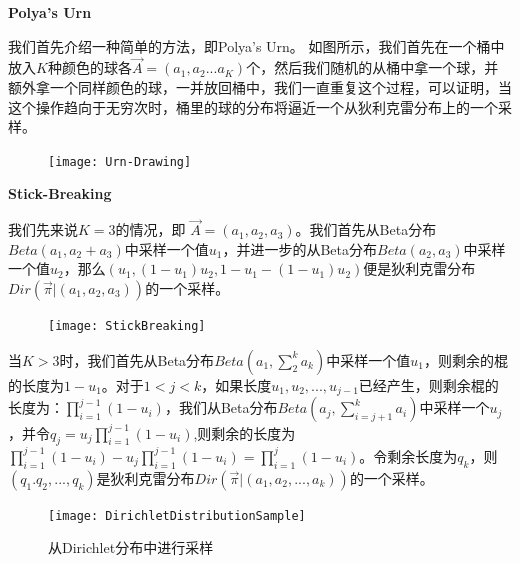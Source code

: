 \textbf{Polya's Urn}
 
我们首先介绍一种简单的方法，即Polya's Urn。
如图所示，我们首先在一个桶中放入$K$种颜色的球各$\vec{A} = (a_1,a_2...a_K)$个，然后我们随机的从桶中拿一个球，并额外拿一个同样颜色的球，一并放回桶中，我们一直重复这个过程，可以证明，当这个操作趋向于无穷次时，桶里的球的分布将逼近一个从狄利克雷分布上的一个采样。

\begin{figure}[htbp]
\centering
\texttt{[image: Urn-Drawing]}
\end{figure}

\textbf{Stick-Breaking}

我们先来说$K=3$的情况，即 $\vec{A} = (a_1,a_2,a_3)$。我们首先从Beta分布$Beta(a_1, a_2+a_3)$中采样一个值$u_1$，并进一步的从Beta分布$Beta(a_2,a_3)$中采样一个值$u_2$，那么$(u_1, (1-u_1)u_2, 1-u_1-(1-u_1)u_2)$便是狄利克雷分布$Dir(\vec{\pi}|(a_1,a_2,a_3))$的一个采样。

\begin{figure}[htbp]
\centering
\texttt{[image: StickBreaking]}
\end{figure}

当$K>3$时，我们首先从Beta分布$Beta(a_1, \sum_{2}^{k}a_k)$中采样一个值$u_1$，则剩余的棍的长度为$1-u_1$。对于$1<j<k$，如果长度$u_1,u_2,...,u_{j-1}$已经产生，则剩余棍的长度为：$\prod_{i=1}^{j-1}(1-u_i)$，我们从Beta分布$Beta(a_j, \sum_{i=j+1}^{k}a_i)$中采样一个$u_j$，并令$q_j=u_j\prod_{i=1}^{j-1}(1-u_i)$,则剩余的长度为$\prod_{i=1}^{j-1}(1-u_i) - u_j\prod_{i=1}^{j-1}(1-u_i) = \prod_{i=1}^{j}(1-u_i)$。令剩余长度为$q_k$，则$(q_1. q_2,...,q_k)$是狄利克雷分布$Dir(\vec{\pi}|(a_1,a_2,...,a_k))$的一个采样。

\begin{figure}[htbp]
\centering
\texttt{[image: DirichletDistributionSample]}
\caption{从Dirichlet分布中进行采样}
\end{figure}
